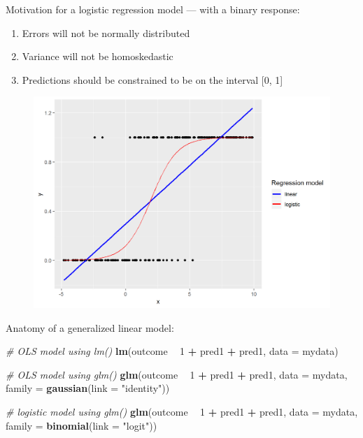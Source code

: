 \documentclass[]{book}
\newenvironment{Shaded}{\begin{snugshade}}{\end{snugshade}}
\newcommand{\KeywordTok}[1]{\textcolor[rgb]{0.13,0.29,0.53}{\textbf{#1}}}
\newcommand{\DataTypeTok}[1]{\textcolor[rgb]{0.13,0.29,0.53}{#1}}
\newcommand{\DecValTok}[1]{\textcolor[rgb]{0.00,0.00,0.81}{#1}}
\newcommand{\StringTok}[1]{\textcolor[rgb]{0.31,0.60,0.02}{#1}}
\newcommand{\CommentTok}[1]{\textcolor[rgb]{0.56,0.35,0.01}{\textit{#1}}}
\newcommand{\OperatorTok}[1]{\textcolor[rgb]{0.81,0.36,0.00}{\textbf{#1}}}
\newcommand{\NormalTok}[1]{#1}
\providecommand{\tightlist}{%
  \setlength{\itemsep}{0pt}\setlength{\parskip}{0pt}}
\begin{document}
Motivation for a logistic regression model --- with a binary response:

\begin{enumerate}
\def\labelenumi{\arabic{enumi}.}
\tightlist
\item
  Errors will not be normally distributed
\item
  Variance will not be homoskedastic
\item
  Predictions should be constrained to be on the interval {[}0, 1{]}
\end{enumerate}

\begin{figure}
\centering
\includegraphics{R/Rmodels/images/logistic.png}
\caption{}
\end{figure}

Anatomy of a generalized linear model:

\begin{Shaded}
\begin{Highlighting}[]
  \CommentTok{# OLS model using lm()}
  \KeywordTok{lm}\NormalTok{(outcome }\OperatorTok{~}\StringTok{ }\DecValTok{1} \OperatorTok{+}\StringTok{ }\NormalTok{pred1 }\OperatorTok{+}\StringTok{ }\NormalTok{pred1, }
     \DataTypeTok{data =}\NormalTok{ mydata)}

  \CommentTok{# OLS model using glm()}
  \KeywordTok{glm}\NormalTok{(outcome }\OperatorTok{~}\StringTok{ }\DecValTok{1} \OperatorTok{+}\StringTok{ }\NormalTok{pred1 }\OperatorTok{+}\StringTok{ }\NormalTok{pred1, }
      \DataTypeTok{data =}\NormalTok{ mydata, }
      \DataTypeTok{family =} \KeywordTok{gaussian}\NormalTok{(}\DataTypeTok{link =} \StringTok{"identity"}\NormalTok{))}
 
  \CommentTok{# logistic model using glm()}
  \KeywordTok{glm}\NormalTok{(outcome }\OperatorTok{~}\StringTok{ }\DecValTok{1} \OperatorTok{+}\StringTok{ }\NormalTok{pred1 }\OperatorTok{+}\StringTok{ }\NormalTok{pred1, }
      \DataTypeTok{data =}\NormalTok{ mydata, }
      \DataTypeTok{family =} \KeywordTok{binomial}\NormalTok{(}\DataTypeTok{link =} \StringTok{"logit"}\NormalTok{))}
\end{Highlighting}
\end{Shaded}
\end{document}
